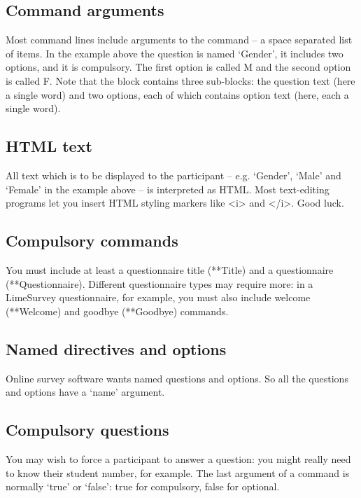 \documentclass[11pt,a4paper]{article}
\begin{document}
\subsection{Command arguments}

Most command lines include arguments to the command -- a space separated list of items. In the example above the question is named `Gender', it includes two options, and it is compulsory. The first option is called M and the second option is called F. Note that the block contains three sub-blocks: the question text (here a single word) and two options, each of which contains option text (here, each a single word).

\subsection{HTML text}

All text which is to be displayed to the participant -- e.g. `Gender', `Male' and `Female' in the example above -- is interpreted as HTML. Most text-editing programs let you insert HTML styling markers like \textless{}i\textgreater{} and \textless{}/i\textgreater{}. Good luck.

\subsection{Compulsory commands}

You must include at least a questionnaire title (**Title) and a questionnaire (**Questionnaire). Different questionnaire types may require more: in a LimeSurvey questionnaire, for example, you must also include welcome (**Welcome) and goodbye (**Goodbye) commands.

\subsection{Named directives and options}

Online survey software wants named questions and options. So all the questions and options have a `name' argument.

\subsection{Compulsory questions}

You may wish to force a participant to answer a question: you might really need to know their student number, for example. The last argument of a command is normally `true' or `false': true for compulsory, false for optional.
\end{document}
